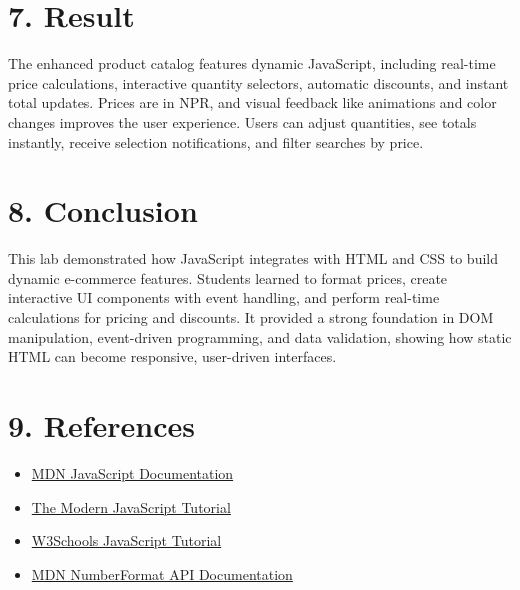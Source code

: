 \documentclass[a4paper,12pt]{article}
\begin{document}
\section*{7. Result}
The enhanced product catalog features dynamic JavaScript, including real-time price calculations, interactive quantity selectors, automatic discounts, and instant total updates. Prices are in NPR, and visual feedback like animations and color changes improves the user experience. Users can adjust quantities, see totals instantly, receive selection notifications, and filter searches by price.

\section*{8. Conclusion}
This lab demonstrated how JavaScript integrates with HTML and CSS to build dynamic e-commerce features. Students learned to format prices, create interactive UI components with event handling, and perform real-time calculations for pricing and discounts. It provided a strong foundation in DOM manipulation, event-driven programming, and data validation, showing how static HTML can become responsive, user-driven interfaces.

\section*{9. References}
\begin{itemize}
  \item \href{https://developer.mozilla.org/en-US/docs/Web/JavaScript}{MDN JavaScript Documentation}
  \item \href{https://javascript.info/}{The Modern JavaScript Tutorial}
  \item \href{https://www.w3schools.com/js/}{W3Schools JavaScript Tutorial}
  \item \href{https://developer.mozilla.org/en-US/docs/Web/JavaScript/Reference/Global_Objects/Intl/NumberFormat}{MDN NumberFormat API Documentation}
\end{itemize}
\end{document}
